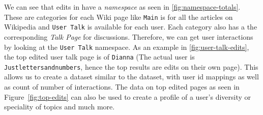 We can see that edits in \usercontrib have a \textit{namespace} as seen in \ref{fig:namespace-totals}. These are categories for each Wiki page like \texttt{Main} is for all the articles on Wikipedia and \texttt{User Talk} is available for each user. Each category also has a the corresponding \textit{Talk Page} for discussions. Therefore, we can get user interactions by looking at the \texttt{User Talk} namespace. As an example in \ref{fig:user-talk-edits}, the top edited user talk page is of \texttt{Dianna} (The actual user is \texttt{Justlettersandnumbers}, hence the top results are edits on their own page). This allows us to create a dataset similar to  the \wikitalk  dataset, with user id mappings as well as count of number of interactions. The data on top edited pages as seen in Figure~\ref{fig:top-edits} can also be used to create a profile of a user's diversity or speciality of topics and much more.

